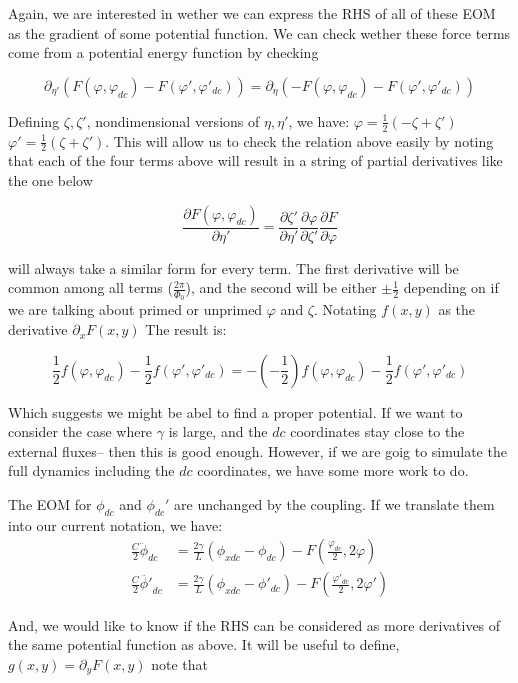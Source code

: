 \documentclass[paper=a4, twocolumn, fontsize=10pt]{article} %
\numberwithin{equation}{section} %
\numberwithin{figure}{section} %
\numberwithin{table}{section} %
\begin{document}
Again, we are interested in wether we can express the RHS of all of these EOM as the gradient of some potential function. We can check wether these force terms come from a potential energy function by checking

\[ \partial_{\eta'} \left( F(\varphi, \varphi_{dc}) - F(\varphi', \varphi'_{dc})\right) = \partial_{\eta} \left( -F(\varphi, \varphi_{dc}) - F(\varphi', \varphi'_{dc})\right) \]


Defining $\zeta,\zeta'$, nondimensional versions of $\eta,\eta'$, we have: $\varphi = \frac{1}{2} (-\zeta+\zeta')$ $\varphi' = \frac{1}{2} (\zeta+\zeta')$. This will allow us to check the relation above easily by noting that each of the four terms above will result in a string of partial derivatives like the one below

\[ \frac{\partial F(\varphi,\varphi_{dc})}{\partial \eta'}  =\frac{\partial \zeta'}{\partial \eta'} \frac{\partial \varphi}{\partial \zeta'} \frac{\partial F}{\partial \varphi} \]

will always take a similar form for every term. The first derivative will be common among all terms ($\frac{2\pi}{\Phi_0}$), and the second will be either $\pm \frac{1}{2}$ depending on if we are talking about primed or unprimed $\varphi$ and $\zeta$. Notating $f(x,y)$ as the derivative $\partial_x F(x,y)$ The result is:

\[ \frac{1}{2} f(\varphi, \varphi_{dc}) - \frac{1}{2} f(\varphi', \varphi'_{dc}) = - \left(-\frac{1}{2}\right) f(\varphi, \varphi_{dc}) - \frac{1}{2} f(\varphi', \varphi'_{dc})\]

Which suggests we might be abel to find a proper potential. If we want to consider the case where $\gamma$ is large, and the $dc$ coordinates stay close to the external fluxes-- then this is good enough. However, if we are goig to simulate the full dynamics including the $dc$ coordinates, we have some more work to do.

The EOM for $\phi_{dc}$ and $\phi_{dc}'$ are unchanged by the coupling. If we translate them into our current notation, we have:
\begin{align}
\frac{C}{2} \ddot{\phi}_{dc} &= \frac{2\gamma}{L}\left( \phi_{xdc} -\phi_{dc}\right) -  F(\frac{\varphi_{dc}}{2}, 2\varphi) \\
\frac{C}{2} \ddot{\phi'}_{dc} &= \frac{2\gamma}{L}\left( \phi_{xdc} -\phi'_{dc}\right) -  F(\frac{\varphi'_{dc}}{2}, 2\varphi')
\end{align}

And, we would like to know if the RHS can be considered as more derivatives of the same potential function as above. It will be useful to define, $g(x,y) = \partial_{y} F(x,y)$ note that
\end{document}

